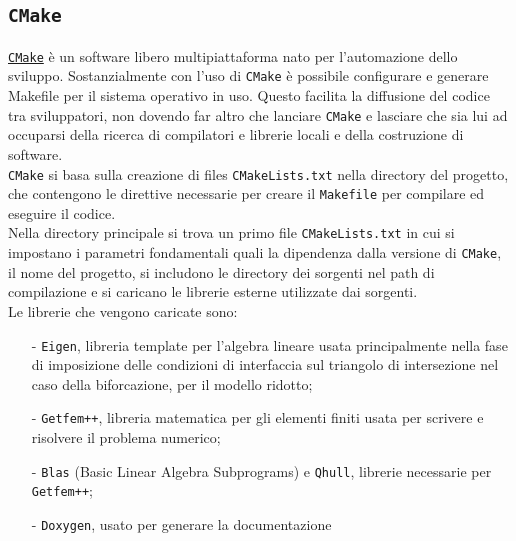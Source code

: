 \subsection{\texttt{CMake}}
\href{http://www.cmake.org/}{\texttt{CMake}} è un software libero multipiattaforma nato per l'automazione dello sviluppo. Sostanzialmente con l'uso di \texttt{CMake} è possibile configurare e generare Makefile per il sistema operativo in uso. Questo facilita la diffusione del codice tra sviluppatori, non dovendo far altro che lanciare \texttt{CMake} e lasciare che sia lui ad occuparsi della ricerca di compilatori e librerie locali e della costruzione di software.\\
\texttt{CMake} si basa sulla creazione di files \texttt{CMakeLists.txt} nella directory del progetto, che contengono le direttive necessarie per creare il \texttt{Makefile} per compilare ed eseguire il codice. \\
Nella directory principale si trova un primo file \texttt{CMakeLists.txt} in cui si impostano i parametri fondamentali quali la dipendenza dalla versione di \texttt{CMake}, il nome del progetto, si includono le directory dei sorgenti nel path di compilazione e si caricano le librerie esterne utilizzate dai sorgenti. \\
Le librerie che vengono caricate sono:
\begin{enumerate}
\item[-] \texttt{Eigen}, libreria template per l'algebra lineare usata principalmente nella fase di imposizione delle condizioni di interfaccia sul triangolo di intersezione nel caso della biforcazione, per il modello ridotto;
\item[-] \texttt{Getfem++}, libreria matematica per gli elementi finiti usata per scrivere e risolvere il problema numerico;
\item[-] \texttt{Blas} (Basic Linear Algebra Subprograms) e \texttt{Qhull}, librerie necessarie per \texttt{Getfem++};
\item[-] \texttt{Doxygen}, usato per generare la documentazione
\end{enumerate}

